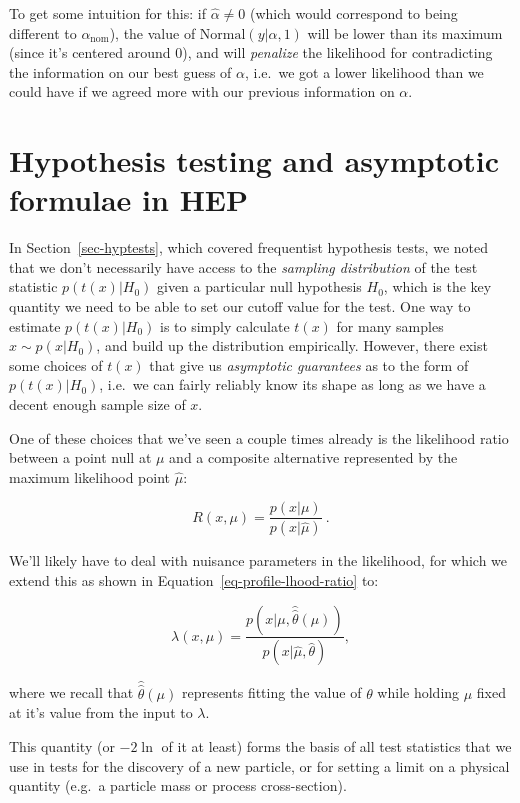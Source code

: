 \documentclass[
  11pt,
  numbers=noendperiod]{book}
\begin{document}
To get some intuition for this: if \(\hat{\alpha}\neq 0\) (which would
correspond to being different to \(\alpha_{\text{nom}}\)), the value of
\(\mathrm{Normal}(y | \alpha , 1)\) will be lower than its maximum
(since it's centered around 0), and will \emph{penalize} the likelihood
for contradicting the information on our best guess of \(\alpha\),
i.e.~we got a lower likelihood than we could have if we agreed more with
our previous information on \(\alpha\).

\hypertarget{sec-asymptotics}{%
\section{Hypothesis testing and asymptotic formulae in
HEP}\label{sec-asymptotics}}

In Section~\ref{sec-hyptests}, which covered frequentist hypothesis
tests, we noted that we don't necessarily have access to the
\emph{sampling distribution} of the test statistic \(p(t(x)|H_0)\) given
a particular null hypothesis \(H_0\), which is the key quantity we need
to be able to set our cutoff value for the test. One way to estimate
\(p(t(x)|H_0)\) is to simply calculate \(t(x)\) for many samples
\(x \sim p(x|H_0)\), and build up the distribution empirically. However,
there exist some choices of \(t(x)\) that give us \emph{asymptotic
guarantees} as to the form of \(p(t(x)|H_0)\), i.e.~we can fairly
reliably know its shape as long as we have a decent enough sample size
of \(x\).

One of these choices that we've seen a couple times already is the
likelihood ratio between a point null at \(\mu\) and a composite
alternative represented by the maximum likelihood point \(\hat{\mu}\):

\[
R(x, \mu) = \frac{p(x|\mu)}{p(x|\hat{\mu})}~.
\]

We'll likely have to deal with nuisance parameters in the likelihood,
for which we extend this as shown in
Equation~\ref{eq-profile-lhood-ratio} to:

\[
\lambda(x, \mu) = \frac{p\left(x|\mu,\hat{\hat{\theta}}(\mu)\right)}{p\left(x| \hat{\mu}, \hat{\theta}\right)},
\]

where we recall that \(\hat{\hat{\theta}}(\mu)\) represents fitting the
value of \(\theta\) while holding \(\mu\) fixed at it's value from the
input to \(\lambda\).

This quantity (or \(-2\ln\) of it at least) forms the basis of all test
statistics that we use in tests for the discovery of a new particle, or
for setting a limit on a physical quantity (e.g.~a particle mass or
process cross-section).
\end{document}
